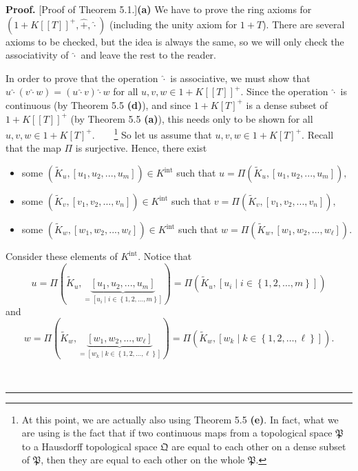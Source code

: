 \documentclass[numbers=enddot,12pt,final,onecolumn,notitlepage]{scrartcl}%
\newenvironment{proof}[1][Proof]{\noindent\textbf{#1.} }{\ \rule{0.5em}{0.5em}}
\begin{document}
\begin{proof}
[Proof of Theorem 5.1.]\textbf{(a)} We have to prove the ring axioms for
$\left(  1+K\left[  \left[  T\right]  \right]  ^{+},\widehat{+},\widehat{\cdot
}\right)  $ (including the unity axiom for $1+T$). There are several axioms to
be checked, but the idea is always the same, so we will only check the
associativity of $\widehat{\cdot}$ and leave the rest to the reader.

In order to prove that the operation $\widehat{\cdot}$ is associative, we must
show that $u\widehat{\cdot}\left(  v\widehat{\cdot}w\right)  =\left(
u\widehat{\cdot}v\right)  \widehat{\cdot}w$ for all $u,v,w\in1+K\left[
\left[  T\right]  \right]  ^{+}$. Since the operation $\widehat{\cdot}$ is
continuous (by Theorem 5.5 \textbf{(d)}), and since $1+K\left[  T\right]
^{+}$ is a dense subset of $1+K\left[  \left[  T\right]  \right]  ^{+}$ (by
Theorem 5.5 \textbf{(a)}), this needs only to be shown for all $u,v,w\in
1+K\left[  T\right]  ^{+}$.\ \ \ \ \footnote{At this point, we are actually
also using Theorem 5.5 \textbf{(e)}. In fact, what we are using is the fact
that if two continuous maps from a topological space $\mathfrak{P}$ to a
Hausdorff topological space $\mathfrak{Q}$ are equal to each other on a dense
subset of $\mathfrak{P}$, then they are equal to each other on the whole
$\mathfrak{P}$.} So let us assume that $u,v,w\in1+K\left[  T\right]  ^{+}$.
Recall that the map $\Pi$ is surjective. Hence, there exist

\begin{itemize}
\item some $\left(  \widetilde{K}_{u},\left[  u_{1},u_{2},...,u_{m}\right]
\right)  \in K^{\operatorname*{int}}$ such that $u=\Pi\left(  \widetilde{K}%
_{u},\left[  u_{1},u_{2},...,u_{m}\right]  \right)  ,$

\item some $\left(  \widetilde{K}_{v},\left[  v_{1},v_{2},...,v_{n}\right]
\right)  \in K^{\operatorname*{int}}$ such that $v=\Pi\left(  \widetilde{K}%
_{v},\left[  v_{1},v_{2},...,v_{n}\right]  \right)  ,$

\item some $\left(  \widetilde{K}_{w},\left[  w_{1},w_{2},...,w_{\ell}\right]
\right)  \in K^{\operatorname*{int}}$ such that $w=\Pi\left(  \widetilde{K}%
_{w},\left[  w_{1},w_{2},...,w_{\ell}\right]  \right)  $.
\end{itemize}

Consider these elements of $K^{\operatorname*{int}}$. Notice that
\[
u=\Pi\left(  \widetilde{K}_{u},\underbrace{\left[  u_{1},u_{2},...,u_{m}%
\right]  }_{=\left[  u_{i}\mid i\in\left\{  1,2,\ldots,m\right\}  \right]
}\right)  =\Pi\left(  \widetilde{K}_{u},\left[  u_{i}\mid i\in\left\{
1,2,\ldots,m\right\}  \right]  \right)
\]
and%
\[
w=\Pi\left(  \widetilde{K}_{w},\underbrace{\left[  w_{1},w_{2},...,w_{\ell
}\right]  }_{=\left[  w_{k}\mid k\in\left\{  1,2,\ldots,\ell\right\}  \right]
}\right)  =\Pi\left(  \widetilde{K}_{w},\left[  w_{k}\mid k\in\left\{
1,2,\ldots,\ell\right\}  \right]  \right)  .
\]



\end{proof}
\end{document}
